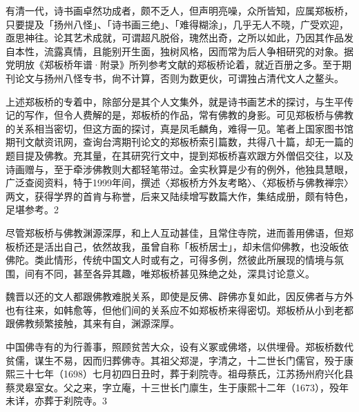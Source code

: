 
有清一代，诗书画卓然功成者，颇不乏人，但声明亮噪，众所皆知，应属郑板桥，只要提及「扬州八怪」、「诗书画三绝」、「难得糊涂」，几乎无人不晓，广受欢迎，亟思神往。论其艺术成就，可谓超凡脱俗，瑰然出奇，之所以如此，乃因其作品发自本性，流露真情，且能别开生面，独树风格，因而常为后人争相研究的对象。据党明放《郑板桥年谱·附录》所列参考文献的郑板桥论着，就近百册之多。至于期刊论文与扬州八怪专书，尙不计算，否则为数更伙，可谓独占清代文人之鳌头。

上述郑板桥的专着中，除部分是其个人文集外，就是诗书画艺术的探讨，与生平传记的写作，但令人费解的是，郑板桥的作品，常有佛教的身影。可见郑板桥与佛教的关系相当密切，但这方面的探讨，真是凤毛麟角，难得一见。笔者上国家图书馆期刊文献资讯网，查询台湾期刊论文的郑板桥索引篇数，共得八十篇，却无一篇的题目提及佛教。充其量，在其研究行文中，提到郑板桥喜欢跟方外僧侣交往，以及诗画赠与，至于牵涉佛教则大都轻笔带过。金实秋算是少有的例外，他独具慧眼，广泛查阅资料，特于1999年间，撰述〈郑板桥方外友考略〉、〈郑板桥与佛教禅宗〉两文，获得学界的首肯与称誉，后来又陆续增写数篇大作，集结成册，颇有特色，足堪参考。2

\vfill
\begin{BookNotes}
\end{BookNotes}

尽管郑板桥与佛教渊源深厚，和上人互动甚佳，且常住寺院，进而善用佛语，但郑板桥还是活出自己，依然故我，虽曾自称「板桥居士」，却未信仰佛教，也没皈依佛陀。类此情形，传统中国文人时或有之，可得多例，然彼此所展现的情境与氛围，间有不同，甚至各异其趣，唯郑板桥甚见殊绝之处，深具讨论意义。


魏晋以还的文人都跟佛教难脱关系，即使是反佛、辟佛亦复如此，因反佛者与方外也有往来，如韩愈等，但他们间的关系应不如郑板桥来得密切。郑板桥从小到老都跟佛教频繁接触，其来有自，渊源深厚。


中国佛寺有的为行善事，照顾贫苦大众，设有义冢或佛塔，以供埋骨。郑板桥数代贫儒，谋生不易，因而归葬佛寺。其祖父郑湜，字清之，十二世长门儒官，殁于康熙三十七年（1698）七月初四日丑时，葬于刹院寺。祖母蔡氏，江苏扬州府兴化县蔡灵皋室女。父之来，字立庵，十三世长门廪生，生于康熙十二年（1673），殁年未详，亦葬于刹院寺。3

